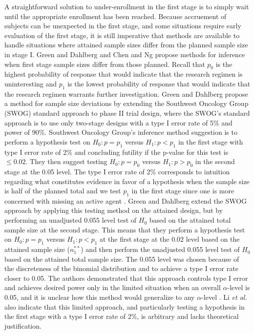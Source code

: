 \documentclass[12pt]{report}\usepackage[]{graphicx}\usepackage[]{color}
\newlength{\li}\setlength{\li}{14.48pt}
\newlength{\di}\setlength{\di}{-3.5mm}
\begin{document}
\indent A straightforward solution to under-enrollment in the first stage is to simply wait until the appropriate enrollment has been reached. Because accruement of subjects can be unexpected in the first stage, and some situations require early evaluation of the first stage, it is still imperative that methods are available to handle situations where attained sample sizes differ from the planned sample size in stage I. Green and Dahlberg \cite{Green} and Chen and Ng \cite{Chen} propose methods for inference when first stage sample sizes differ from those planned. Recall that $p_0$ is the highest probability of response that would indicate that the research regimen is uninteresting and $p_1$ is the lowest probability of response that would indicate that the research regimen warrants further investigation. Green and Dahlberg propose a method for sample size deviations by extending the Southwest Oncology Group (SWOG) standard approach to phase II trial design, where the SWOG's standard approach is to use only two-stage designs with a type I error rate of 5\% and power of 90\%. Southwest Oncology Group's inference method suggestion is to perform a hypothesis test on $H_0: p=p_1$ versus $H_1: p < p_1$ in the first stage with type I error rate of 2\% and concluding futility if the p-value for this test is $\leq 0.02$. They then suggest testing $H_0: p=p_0$ versus $H_1: p > p_0$ in the second stage at the 0.05 level. The type I error rate of 2\% corresponds to intuition regarding what constitutes evidence in favor of a hypothesis when the sample size is half of the planned total and we test $p_1$ in the first stage since one is more concerned with missing an active agent \cite{Green}. Green and Dahlberg extend the SWOG approach by applying this testing method on the attained design, but by performing an unadjusted 0.055 level test of $H_0$ based on the attained total sample size at the second stage. This means that they perform a hypothesis test on $H_0: p=p_1$ versus $H_1: p < p_1$ at the first stage at the 0.02 level based on the attained sample size ($n_1^{\ast\ast}$) and then perform the unadjusted 0.055 level test of $H_0$ based on the attained total sample size. \cite{Green} The 0.055 level was chosen because of the discreteness of the binomial distribution and to achieve a type I error rate closer to 0.05. The authors demonstrated that this approach controls type I error and achieves desired power only in the limited situation when an overall $\alpha$-level is 0.05, and it is unclear how this method would generalize to any $\alpha$-level \cite{Li}. Li \textit{et al.} also indicate that this limited approach, and particularly testing a hypothesis in the first stage with a type I error rate of 2\%, is arbitrary and lacks theoretical justification.  \\
\end{document}
